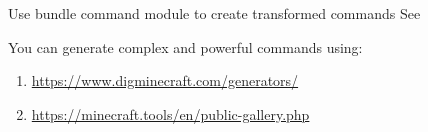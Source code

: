 \begin{tips}{Use bundle command module to create transformed commands}
    See~
\end{tips}

\clearpage
{}
You can generate complex and powerful commands using:
\begin{enumerate}
    \item \url{https://www.digminecraft.com/generators/}
    \item \url{https://minecraft.tools/en/public-gallery.php}
\end{enumerate}


